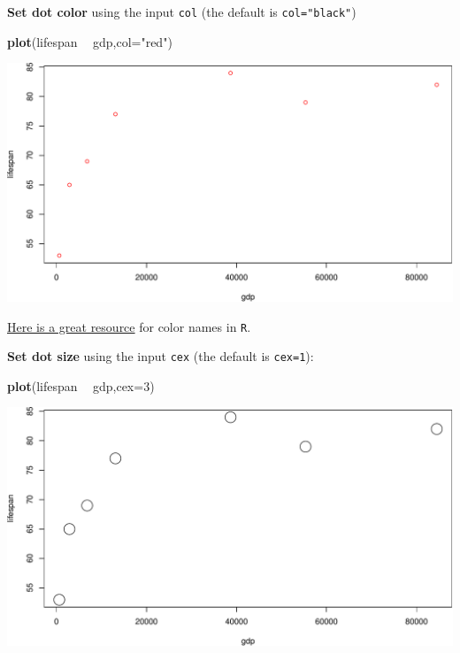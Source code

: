 \documentclass[
]{book}
\newenvironment{Shaded}{\begin{snugshade}}{\end{snugshade}}
\newcommand{\DataTypeTok}[1]{\textcolor[rgb]{0.13,0.29,0.53}{#1}}
\newcommand{\DecValTok}[1]{\textcolor[rgb]{0.00,0.00,0.81}{#1}}
\newcommand{\KeywordTok}[1]{\textcolor[rgb]{0.13,0.29,0.53}{\textbf{#1}}}
\newcommand{\NormalTok}[1]{#1}
\newcommand{\OperatorTok}[1]{\textcolor[rgb]{0.81,0.36,0.00}{\textbf{#1}}}
\newcommand{\StringTok}[1]{\textcolor[rgb]{0.31,0.60,0.02}{#1}}
\begin{document}
\textbf{Set dot color} using the input \texttt{col} (the default is \texttt{col="black"})

\begin{Shaded}
\begin{Highlighting}[]
\KeywordTok{plot}\NormalTok{(lifespan }\OperatorTok{~}\StringTok{ }\NormalTok{gdp,}\DataTypeTok{col=}\StringTok{"red"}\NormalTok{)}
\end{Highlighting}
\end{Shaded}

\includegraphics{figures/unnamed-chunk-105-1.pdf}

\href{http://www.stat.columbia.edu/~tzheng/files/Rcolor.pdf?utm_source=twitterfeed\&utm_medium=twitter}{Here is a great resource} for color names in \texttt{R}.

\textbf{Set dot size} using the input \texttt{cex} (the default is \texttt{cex=1}):

\begin{Shaded}
\begin{Highlighting}[]
\KeywordTok{plot}\NormalTok{(lifespan }\OperatorTok{~}\StringTok{ }\NormalTok{gdp,}\DataTypeTok{cex=}\DecValTok{3}\NormalTok{)}
\end{Highlighting}
\end{Shaded}

\includegraphics{figures/unnamed-chunk-106-1.pdf}
\end{document}
